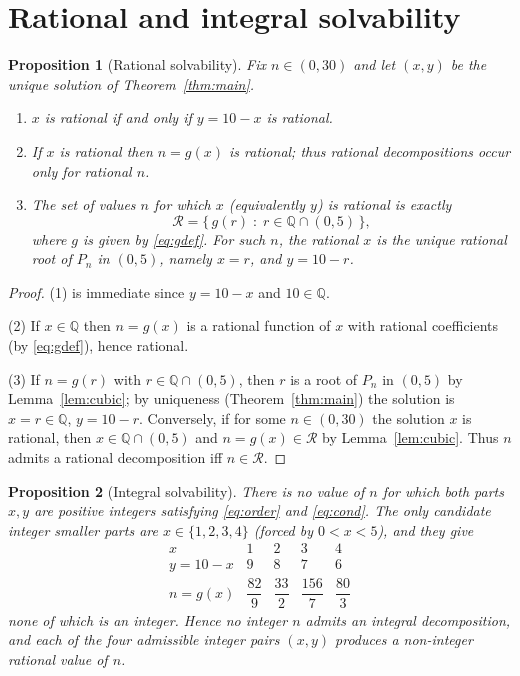 \documentclass{amsart}
\newtheorem{proposition}{Proposition}
\theoremstyle{remark}
\begin{document}
\section{Rational and integral solvability}

\begin{proposition}[Rational solvability]\label{prop:rat}
Fix $n\in(0,30)$ and let $(x,y)$ be the unique solution of
Theorem~\ref{thm:main}.
\begin{enumerate}
\item $x$ is rational if and only if $y=10-x$ is rational.
\item If $x$ is rational then $n=g(x)$ is rational; thus rational
decompositions occur only for rational $n$.
\item The set of values $n$ for which $x$ (equivalently $y$) is rational is
exactly
\[
\mathcal{R}=\bigl\{\,g(r)\;:\; r\in\mathbb{Q}\cap(0,5)\,\bigr\},
\]
where $g$ is given by \eqref{eq:gdef}. For such $n$, the rational $x$ is the
unique rational root of $P_n$ in $(0,5)$, namely $x=r$, and $y=10-r$.
\end{enumerate}
\end{proposition}

\begin{proof}
(1) is immediate since $y=10-x$ and $10\in\mathbb{Q}$.

(2) If $x\in\mathbb{Q}$ then $n=g(x)$ is a rational function of $x$ with
rational coefficients (by \eqref{eq:gdef}), hence rational.

(3) If $n=g(r)$ with $r\in\mathbb{Q}\cap(0,5)$, then $r$ is a root of $P_n$
in $(0,5)$ by Lemma~\ref{lem:cubic}; by uniqueness (Theorem~\ref{thm:main})
the solution is $x=r\in\mathbb{Q}$, $y=10-r$. Conversely, if for some
$n\in(0,30)$ the solution $x$ is rational, then $x\in\mathbb{Q}\cap(0,5)$ and
$n=g(x)\in\mathcal R$ by Lemma~\ref{lem:cubic}. Thus $n$ admits a rational
decomposition iff $n\in\mathcal R$.
\end{proof}

\begin{proposition}[Integral solvability]\label{prop:int}
There is \emph{no} value of $n$ for which both parts $x,y$ are positive
integers satisfying \eqref{eq:order} and \eqref{eq:cond}. The only candidate
integer smaller parts are $x\in\{1,2,3,4\}$ (forced by $0<x<5$), and they give
\[
\begin{array}{c|cccc}
x & 1 & 2 & 3 & 4\\\hline
y=10-x & 9 & 8 & 7 & 6\\[2pt]
n=g(x) & \dfrac{82}{9} & \dfrac{33}{2} & \dfrac{156}{7} & \dfrac{80}{3}
\end{array}
\]
none of which is an integer. Hence no integer $n$ admits an integral
decomposition, and each of the four admissible integer pairs $(x,y)$ produces a
non-integer rational value of $n$.
\end{proposition}
\end{document}
